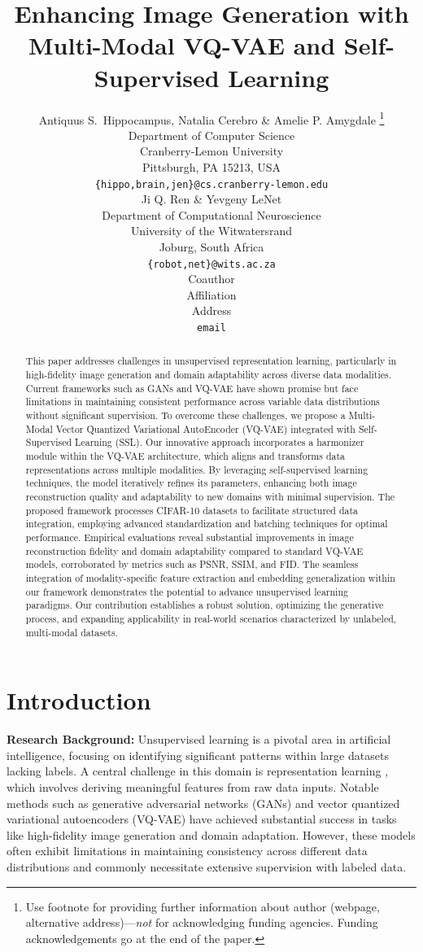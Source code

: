 \documentclass{article} %
\title{Enhancing Image Generation with Multi-Modal VQ-VAE and Self-Supervised Learning}
\author{Antiquus S.~Hippocampus, Natalia Cerebro \& Amelie P. Amygdale \thanks{ Use footnote for providing further information
about author (webpage, alternative address)---\emph{not} for acknowledging
funding agencies.  Funding acknowledgements go at the end of the paper.} \\
Department of Computer Science\\
Cranberry-Lemon University\\
Pittsburgh, PA 15213, USA \\
\texttt{\{hippo,brain,jen\}@cs.cranberry-lemon.edu} \\
\And
Ji Q. Ren \& Yevgeny LeNet \\
Department of Computational Neuroscience \\
University of the Witwatersrand \\
Joburg, South Africa \\
\texttt{\{robot,net\}@wits.ac.za} \\
\AND
Coauthor \\
Affiliation \\
Address \\
\texttt{email}
}
\begin{document}
\maketitle


\begin{abstract}
This paper addresses challenges in unsupervised representation learning, particularly in high-fidelity image generation and domain adaptability across diverse data modalities. Current frameworks such as GANs and VQ-VAE have shown promise but face limitations in maintaining consistent performance across variable data distributions without significant supervision. To overcome these challenges, we propose a Multi-Modal Vector Quantized Variational AutoEncoder (VQ-VAE) integrated with Self-Supervised Learning (SSL). Our innovative approach incorporates a harmonizer module within the VQ-VAE architecture, which aligns and transforms data representations across multiple modalities. By leveraging self-supervised learning techniques, the model iteratively refines its parameters, enhancing both image reconstruction quality and adaptability to new domains with minimal supervision. The proposed framework processes CIFAR-10 datasets to facilitate structured data integration, employing advanced standardization and batching techniques for optimal performance. Empirical evaluations reveal substantial improvements in image reconstruction fidelity and domain adaptability compared to standard VQ-VAE models, corroborated by metrics such as PSNR, SSIM, and FID. The seamless integration of modality-specific feature extraction and embedding generalization within our framework demonstrates the potential to advance unsupervised learning paradigms. Our contribution establishes a robust solution, optimizing the generative process, and expanding applicability in real-world scenarios characterized by unlabeled, multi-modal datasets.

\end{abstract}


\section{Introduction}

\textbf{Research Background:} Unsupervised learning is a pivotal area in artificial intelligence, focusing on identifying significant patterns within large datasets lacking labels. A central challenge in this domain is representation learning \citep{bengio2013representation, lecun2015deep}, which involves deriving meaningful features from raw data inputs. Notable methods such as generative adversarial networks (GANs) \citep{goodfellow2014generative} and vector quantized variational autoencoders (VQ-VAE) \citep{van2017neural} have achieved substantial success in tasks like high-fidelity image generation and domain adaptation. However, these models often exhibit limitations in maintaining consistency across different data distributions and commonly necessitate extensive supervision with labeled data.
\end{document}

